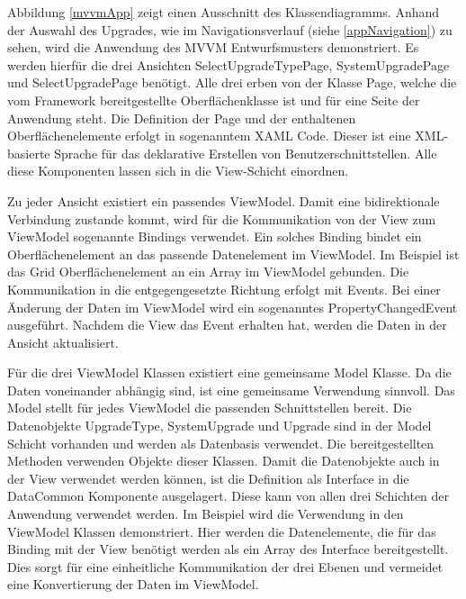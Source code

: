 Abbildung \ref{mvvmApp} zeigt einen Ausschnitt des Klassendiagramms. Anhand der Auswahl des Upgrades, wie im Navigationsverlauf (siehe \ref{appNavigation}) zu sehen, wird die Anwendung des MVVM Entwurfsmusters demonstriert. Es werden hierfür die drei Ansichten SelectUpgradeTypePage, SystemUpgradePage und SelectUpgradePage benötigt. Alle drei erben von der Klasse Page, welche die vom Framework bereitgestellte Oberflächenklasse ist und für eine Seite der Anwendung steht. Die Definition der Page und der enthaltenen Oberflächenelemente erfolgt in sogenanntem XAML Code. Dieser ist eine XML-basierte Sprache für das deklarative Erstellen von Benutzerschnittstellen. Alle diese Komponenten lassen sich in die View-Schicht einordnen. \par 

Zu jeder Ansicht existiert ein passendes ViewModel. Damit eine bidirektionale Verbindung zustande kommt, wird für die Kommunikation von der View zum ViewModel sogenannte Bindings verwendet. Ein solches Binding bindet ein Oberflächenelement an das passende Datenelement im ViewModel. Im Beispiel ist das Grid Oberflächenelement an ein Array im ViewModel gebunden. Die Kommunikation in die entgegengesetzte Richtung erfolgt mit Events. Bei einer Änderung der Daten im ViewModel wird ein sogenanntes PropertyChangedEvent ausgeführt. Nachdem die View das Event erhalten hat, werden die Daten in der Ansicht aktualisiert. \par

Für die drei ViewModel Klassen existiert eine gemeinsame Model Klasse. Da die Daten voneinander abhängig sind, ist eine gemeinsame Verwendung sinnvoll. Das Model stellt für jedes ViewModel die passenden Schnittstellen bereit. Die Datenobjekte UpgradeType, SystemUpgrade und Upgrade sind in der Model Schicht vorhanden und werden als Datenbasis verwendet. Die bereitgestellten Methoden verwenden Objekte dieser Klassen. Damit die Datenobjekte auch in der View verwendet werden können, ist die Definition als Interface in die DataCommon Komponente ausgelagert. Diese kann von allen drei Schichten der Anwendung verwendet werden. Im Beispiel wird die Verwendung in den ViewModel Klassen demonstriert. Hier werden die Datenelemente, die für das Binding mit der View benötigt werden als ein Array des Interface bereitgestellt. Dies sorgt für eine einheitliche Kommunikation der drei Ebenen und vermeidet eine Konvertierung der Daten im ViewModel.



